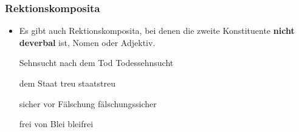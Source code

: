 \begin{frame}
\frametitle{Rektionskomposita}

\begin{itemize}
	\item Es gibt auch Rektionskomposita, bei denen die zweite Konstituente \textbf{nicht deverbal} ist, \zB Nomen oder Adjektiv.
	
	\settowidth\jamwidth{[2 ArgumenteXXXXXXXXXXXXXXX]} 
	\ea 

		\ex Sehnsucht nach dem Tod \ras Todessehnsucht
		 
		\ex dem Staat treu \ras  staatstreu
		
		\ex sicher vor Fälschung \ras fälschungssicher
		
		\ex frei von Blei \ras bleifrei
		\z 
	\z


		 
\end{itemize}

\end{frame}




